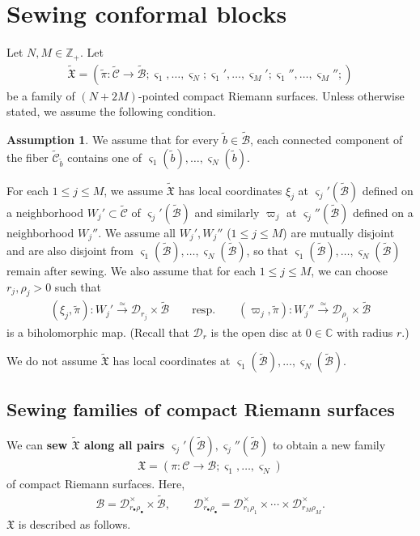 \documentclass[12pt,a4paper,notitlepage]{article}
\theoremstyle{definition}
\newtheorem{ass}[df]{Assumption}
\theoremstyle{plain}
\newcommand{\fk}{\mathfrak}
\newcommand{\mc}{\mathcal}
\newcommand{\wtd}{\widetilde}
\newcommand{\sgm}{\varsigma}
\newcommand{\blt}{\bullet}
\newcommand{\Cbb}{\mathbb C}
\newcommand{\Zbb}{\mathbb Z}
\numberwithin{equation}{section}
\begin{document}
\section{Sewing conformal blocks}\label{lb18}

Let $N,M\in\Zbb_+$. Let
\begin{align*}
\wtd{\fk X}=(\wtd\pi:\wtd{\mc C}\rightarrow\wtd{\mc B};\sgm_1,\dots,\sgm_N;\sgm_1',\dots,\sgm_M';\sgm_1'',\dots,\sgm_M'';)
\end{align*}
be a family of $(N+2M)$-pointed compact Riemann surfaces. Unless otherwise stated, we assume the following condition.
\begin{ass}\label{lb26}
We assume that for every $\wtd b\in\wtd{\mc B}$, each connected component of the fiber $\wtd{\mc C}_{\wtd b}$ contains one of $\sgm_1(\wtd b),\dots,\sgm_N(\wtd b)$.  
\end{ass}
For each $1\leq j\leq M$,  we assume $\wtd{\fk X}$ has  local coordinates $\xi_j$ at $\sgm_j'(\wtd{\mc B})$ defined on a neighborhood $W_j'\subset\wtd{\mc C}$ of $\sgm_j'(\wtd{\mc B})$ and similarly $\varpi_j$ at $\sgm_j''(\wtd{\mc B})$ defined on a neighborhood $W_j''$. We assume all $W_j',W_j''$ ($1\leq j\leq M$) are mutually disjoint and are also disjoint from $\sgm_1(\wtd{\mc B}),\dots,\sgm_N(\wtd {\mc B})$, so that $\sgm_1(\wtd{\mc B}),\dots,\sgm_N(\wtd {\mc B})$ remain after sewing. We also assume that for each $1\leq j\leq M$, we can choose $r_j,\rho_j>0$  such that
\begin{gather}
	(\xi_j,\wtd\pi):W_j'\xrightarrow{\simeq} \mc D_{r_j}\times\wtd{\mc B}\qquad\text{resp.}\qquad (\varpi_j,\wtd\pi):W_j''\xrightarrow{\simeq} \mc D_{\rho_j}\times\wtd{\mc B}\label{eq94}
\end{gather}
is a biholomorphic map. (Recall that $\mc D_r$ is the open disc at $0\in\Cbb$ with radius $r$.) 

We do not assume $\wtd{\fk X}$ has local coordinates at $\sgm_1(\wtd{\mc B}),\dots,\sgm_N(\wtd{\mc B})$.



\subsection*{Sewing families of compact Riemann surfaces}


We can \textbf{sew $\wtd{\fk X}$ along all pairs $\sgm_j'(\wtd{\mc B}),\sgm_j''(\wtd{\mc B})$} to obtain a new family
\begin{align}
\fk X=(\pi:\mc C\rightarrow\mc B;\sgm_1,\dots,\sgm_N)	
\end{align}
of compact Riemann surfaces. Here, \index{Drrho@$\mc D_{r_\blt\rho_\blt}^\times$}
\begin{gather*}
\mc B=	\mc D^\times_{r_\blt\rho_\blt}\times\wtd{\mc B},\qquad \mc D^\times_{r_\blt\rho_\blt}=\mc D^\times_{r_1\rho_1}\times\cdots\times\mc D^\times_{r_M\rho_M}.
\end{gather*}
$\fk X$ is described as follows.
\end{document}
